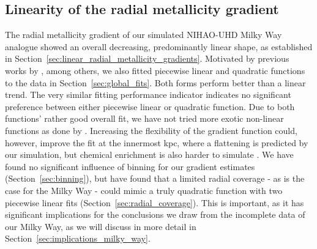 \documentclass[fleqn,usenatbib]{mnras}
\begin{document}
\subsection{Linearity of the radial metallicity gradient} \label{sec:discussion_linearity}

The radial metallicity gradient of our simulated NIHAO-UHD Milky Way analogue showed an overall decreasing, predominantly linear shape, as established in Section~\ref{sec:linear_radial_metallicity_gradients}. Motivated by previous works by \citet{SanchezMenguiano2016}, among others, we also fitted piecewise linear and quadratic functions to the data in Section~\ref{sec:global_fits}. Both forms perform better than a linear trend. The very similar fitting performance indicator indicates no significant preference between either piecewise linear or quadratic function. Due to both functions' rather good overall fit, we have not tried more exotic non-linear functions as done by \citet{Scarano2013}. Increasing the flexibility of the gradient function could, however, improve the fit at the innermost kpc, where a flattening is predicted by our simulation, but chemical enrichment is also harder to simulate \citep[see also][]{Minchev2013, Sun2024}. We have found no significant influence of binning for our gradient estimates (Section~\ref{sec:binning}), but have found that a limited radial coverage - as is the case for the Milky Way - could mimic a truly quadratic function with two piecewise linear fits (Section~\ref{sec:radial_coverage}). This is important, as it has significant implications for the conclusions we draw from the incomplete data of our Milky Way, as we will discuss in more detail in Section~\ref{sec:implications_milky_way}.
\end{document}

